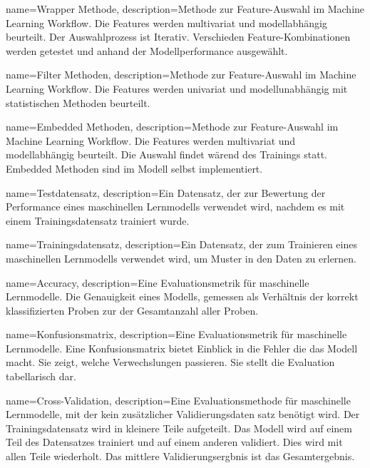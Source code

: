 {
        name=Wrapper Methode,
        description={Methode zur Feature-Auswahl im Machine Learning Workflow. Die Features werden multivariat und modellabhängig beurteilt. Der Auswahlprozess ist Iterativ. Verschieden Feature-Kombinationen werden getestet und anhand der Modellperformance ausgewählt. }
}

{
        name=Filter Methoden,
        description={Methode zur Feature-Auswahl im Machine Learning Workflow. Die Features werden univariat und modellunabhängig mit statistischen Methoden beurteilt. }
}

{
        name=Embedded Methoden,
        description={Methode zur Feature-Auswahl im Machine Learning Workflow. Die Features werden multivariat und modellabhängig beurteilt. Die Auswahl findet wärend des Trainings statt. Embedded Methoden sind im Modell selbst implementiert.}
}

{
        name=Testdatensatz,
        description={Ein Datensatz, der zur Bewertung der Performance eines maschinellen Lernmodells verwendet wird, nachdem es mit einem Trainingsdatensatz trainiert wurde.}
}

{
        name=Trainingsdatensatz,
        description={Ein Datensatz, der zum Trainieren eines maschinellen Lernmodells verwendet wird, um Muster in den Daten zu erlernen.}
}

{
        name=Accuracy,
        description={Eine Evaluationsmetrik für maschinelle Lernmodelle. Die Genauigkeit eines Modells, gemessen als Verhältnis der korrekt klassifizierten Proben zur der Gesamtanzahl aller Proben.}
}

{
        name=Konfusionsmatrix,
        description={Eine Evaluationsmetrik für maschinelle Lernmodelle. Eine Konfusionsmatrix bietet Einblick in die Fehler die das Modell macht. Sie zeigt, welche Verwechslungen passieren. Sie stellt die Evaluation tabellarisch dar.}
}

{
        name=Cross-Validation,
        description={Eine Evaluationsmethode für maschinelle Lernmodelle, mit der kein zusätzlicher Validierungsdaten satz benötigt wird. Der Trainingsdatensatz wird in kleinere Teile aufgeteilt. Das Modell wird auf einem Teil des Datensatzes trainiert und auf einem anderen validiert. Dies wird mit allen Teile wiederholt. Das mittlere Validierungsergbnis ist das Gesamtergebnis.}
}

